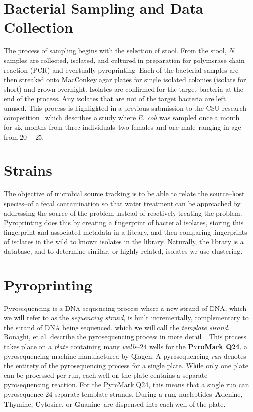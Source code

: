 \documentclass[12pt]{ucthesis}
\begin{document}
   \section{Bacterial Sampling and Data Collection}\label{sec:sampling}
      The process of sampling begins with the selection of stool. From the
      stool, $N$ samples are collected, isolated, and cultured in preparation
      for polymerase chain reaction (PCR) and eventually pyroprinting. Each of
      the bacterial samples are then streaked onto MacConkey agar plates for
      single isolated colonies (isolate for short) and grown overnight.
      Isolates are confirmed for the target bacteria at the end of the process.
      Any isolates that are not of the target bacteria are left unused. This
      process is highlighted in a previous submission to the CSU research
      competition~\cite{Montana:CRC} which describes a study where \textit{E.
      coli} was sampled once a month for six months from three individuals--two
      females and one male--ranging in age from $20-25$.
      
   \section{Strains}\label{sec:strains}
      The objective of microbial source tracking is to be able to relate the
      source--host species--of a fecal contamination so that water treatment
      can be approached by addressing the source of the problem instead of
      reactively treating the problem. Pyroprinting does this by creating
      a fingerprint of bacterial isolates, storing this fingerprint and
      associated metadata in a library, and then comparing fingerprints of
      isolates in the wild to known isolates in the library. Naturally, the
      library is a database, and to determine similar, or highly-related,
      isolates we use clustering.

   \section{Pyroprinting}\label{sec:pyroprinting}
      Pyrosequencing is a DNA sequencing process where a new strand of DNA,
      which we will refer to as the \textit{sequencing strand}, is built
      incrementally, complementary to the strand of DNA being sequenced, which
      we will call the \textit{template strand}. Ronaghi, et al. describe the
      pyrosequencing process in more detail~\cite{ronaghi:shedsLight}. This
      process takes place on a \textit{plate} containing many
      \textit{wells}--$24$ wells for the \textbf{PyroMark Q24}, a
      pyrosequencing machine manufactured by Qiagen. A pyrosequencing
      \textit{run} denotes the entirety of the pyrosequencing process for a
      single plate. While only one plate can be processed per run, each well on
      the plate contains a separate pyrosequencing reaction. For the PyroMark
      Q24, this means that a single run can pyrosequence 24 separate template
      strands. During a run, nucleotides--\textbf{A}denine, \textbf{T}hymine,
      \textbf{C}ytosine, or \textbf{G}uanine--are dispensed into each well of
      the plate.
      
\end{document}
